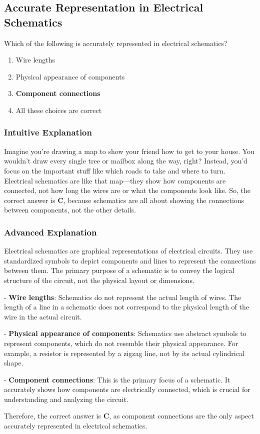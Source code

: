 \subsection{Accurate Representation in Electrical Schematics}
\label{T6C12}

\begin{tcolorbox}[colback=gray!10!white,colframe=black!75!black,title=T6C12]
Which of the following is accurately represented in electrical schematics?
\begin{enumerate}[label=\Alph*)]
    \item Wire lengths
    \item Physical appearance of components
    \item \textbf{Component connections}
    \item All these choices are correct
\end{enumerate}
\end{tcolorbox}

\subsubsection{Intuitive Explanation}
Imagine you’re drawing a map to show your friend how to get to your house. You wouldn’t draw every single tree or mailbox along the way, right? Instead, you’d focus on the important stuff like which roads to take and where to turn. Electrical schematics are like that map—they show how components are connected, not how long the wires are or what the components look like. So, the correct answer is \textbf{C}, because schematics are all about showing the connections between components, not the other details.

\subsubsection{Advanced Explanation}
Electrical schematics are graphical representations of electrical circuits. They use standardized symbols to depict components and lines to represent the connections between them. The primary purpose of a schematic is to convey the logical structure of the circuit, not the physical layout or dimensions. 

- \textbf{Wire lengths}: Schematics do not represent the actual length of wires. The length of a line in a schematic does not correspond to the physical length of the wire in the actual circuit.
  
- \textbf{Physical appearance of components}: Schematics use abstract symbols to represent components, which do not resemble their physical appearance. For example, a resistor is represented by a zigzag line, not by its actual cylindrical shape.
  
- \textbf{Component connections}: This is the primary focus of a schematic. It accurately shows how components are electrically connected, which is crucial for understanding and analyzing the circuit.

Therefore, the correct answer is \textbf{C}, as component connections are the only aspect accurately represented in electrical schematics.

